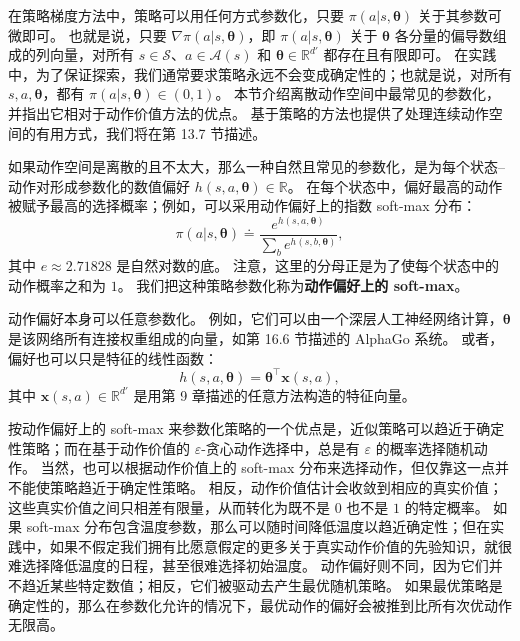 \documentclass[UTF8, 12pt, fontset=fandol, oneside]{ctexart}
\begin{document}
在策略梯度方法中，策略可以用任何方式参数化，只要 $\pi(a|s,\boldsymbol{\theta})$ 关于其参数可微即可。
也就是说，只要 $\nabla\pi(a|s,\boldsymbol{\theta})$，即 $\pi(a|s,\boldsymbol{\theta})$ 关于 $\boldsymbol{\theta}$ 各分量的偏导数组成的列向量，对所有 $s\in\mathcal{S}$、$a\in\mathcal{A}(s)$ 和 $\boldsymbol{\theta}\in\mathbb{R}^{d'}$ 都存在且有限即可。
在实践中，为了保证探索，我们通常要求策略永远不会变成确定性的；也就是说，对所有 $s,a,\boldsymbol{\theta}$，都有 $\pi(a|s,\boldsymbol{\theta})\in(0,1)$。
本节介绍离散动作空间中最常见的参数化，并指出它相对于动作价值方法的优点。
基于策略的方法也提供了处理连续动作空间的有用方式，我们将在第 13.7 节描述。

如果动作空间是离散的且不太大，那么一种自然且常见的参数化，是为每个状态--动作对形成参数化的数值偏好 $h(s,a,\boldsymbol{\theta})\in\mathbb{R}$。
在每个状态中，偏好最高的动作被赋予最高的选择概率；例如，可以采用动作偏好上的指数 soft-max 分布：
\begin{equation}
\pi(a|s,\boldsymbol{\theta})\doteq
\frac{e^{h(s,a,\boldsymbol{\theta})}}
{\sum_b e^{h(s,b,\boldsymbol{\theta})}},
\tag{13.2}
\end{equation}
其中 $e\approx2.71828$ 是自然对数的底。
注意，这里的分母正是为了使每个状态中的动作概率之和为 $1$。
我们把这种策略参数化称为\textbf{动作偏好上的 soft-max}。

动作偏好本身可以任意参数化。
例如，它们可以由一个深层人工神经网络计算，$\boldsymbol{\theta}$ 是该网络所有连接权重组成的向量，如第 16.6 节描述的 AlphaGo 系统。
或者，偏好也可以只是特征的线性函数：
\begin{equation}
h(s,a,\boldsymbol{\theta})=\boldsymbol{\theta}^\top \mathbf{x}(s,a),
\tag{13.3}
\end{equation}
其中 $\mathbf{x}(s,a)\in\mathbb{R}^{d'}$ 是用第 9 章描述的任意方法构造的特征向量。

按动作偏好上的 soft-max 来参数化策略的一个优点是，近似策略可以趋近于确定性策略；而在基于动作价值的 $\varepsilon$-贪心动作选择中，总是有 $\varepsilon$ 的概率选择随机动作。
当然，也可以根据动作价值上的 soft-max 分布来选择动作，但仅靠这一点并不能使策略趋近于确定性策略。
相反，动作价值估计会收敛到相应的真实价值；这些真实价值之间只相差有限量，从而转化为既不是 $0$ 也不是 $1$ 的特定概率。
如果 soft-max 分布包含温度参数，那么可以随时间降低温度以趋近确定性；但在实践中，如果不假定我们拥有比愿意假定的更多关于真实动作价值的先验知识，就很难选择降低温度的日程，甚至很难选择初始温度。
动作偏好则不同，因为它们并不趋近某些特定数值；相反，它们被驱动去产生最优随机策略。
如果最优策略是确定性的，那么在参数化允许的情况下，最优动作的偏好会被推到比所有次优动作无限高。
\end{document}
